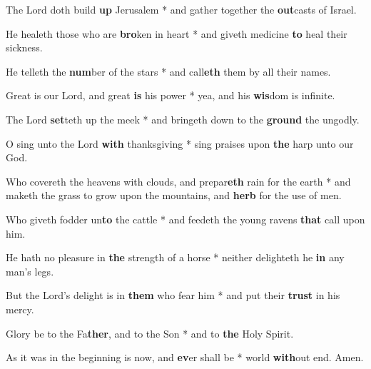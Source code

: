 \begin{multicols}{2}
	The Lord doth build \textbf{up} Jerusalem * and gather together the \textbf{out}casts of Israel.
	
	He healeth those who are \textbf{bro}ken in heart * and giveth medicine \textbf{to} heal their sickness.
	
	He telleth the \textbf{num}ber of the stars * and call\textbf{eth} them by all their names.
	
	Great is our Lord, and great \textbf{is} his power * yea, and his \textbf{wis}dom is infinite.
	
	The Lord \textbf{set}teth up the meek * and bringeth down to the \textbf{ground} the ungodly.
	
	O sing unto the Lord \textbf{with} thanksgiving * sing praises upon \textbf{the} harp unto our God.
	
	Who covereth the heavens with clouds, and prepar\textbf{eth} rain for the earth * and maketh the grass to grow upon the mountains, and \textbf{herb} for the use of men.
	
	Who giveth fodder un\textbf{to} the cattle * and feedeth the young ravens \textbf{that} call upon him.
	
	He hath no pleasure in \textbf{the} strength of a horse * neither delighteth he \textbf{in} any man's legs.
	
	But the Lord's delight is in \textbf{them} who fear him * and put their \textbf{trust} in his mercy.
	
	Glory be to the Fa\textbf{ther}, and to the Son * and to \textbf{the} Holy Spirit.
	
	As it was in the beginning is now, and \textbf{ev}er shall be * world \textbf{with}out end. Amen.
\end{multicols}